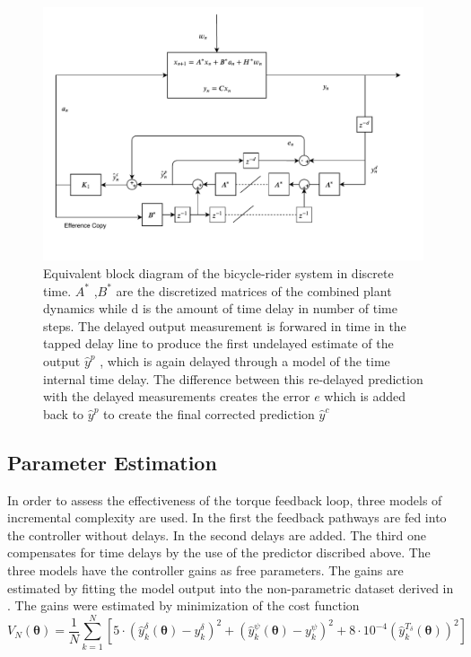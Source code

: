  \begin{figure}[ht]
    \centering
    \captionsetup{justification=centering,margin=2cm}

    \includegraphics[scale=0.6]{images/discrete_block.pdf}
    \caption{Equivalent block diagram of the bicycle-rider system in discrete time. \ensuremath{A^*} ,\ensuremath{B^*} are the discretized matrices of the combined plant dynamics while d is the amount of time delay in number of time steps. The delayed output measurement is forwared in time in the tapped delay line to produce the first undelayed estimate of the output \ensuremath{\hat{y}^p} , which is again delayed through a model of the time internal time delay. The difference between this re-delayed prediction with the delayed measurements creates the error \ensuremath{e} which is added back to  \ensuremath{\hat{y}^p}  to create the final corrected prediction \ensuremath{\hat{y}^c} }
    \label{fig:paper4}
\end{figure}

\subsection{Parameter Estimation }

In order to assess the effectiveness of the torque feedback loop, three models of incremental complexity are used. In the first the feedback pathways are fed into the controller without delays. In the second delays are added. The third one compensates for time delays by the use of the predictor discribed above. The three models have the  controller gains as free parameters. The gains are estimated by fitting the model output into the non-parametric dataset derived in \cite{dialynaseffect}.  The gains were estimated by minimization of the cost function 
\begin{equation}
    V_{N}(\boldsymbol{\theta})=\frac{1}{N} \sum_{k=1}^{N}\left[5\cdot\left(\hat{y}^{\delta}_k(\mathbf{\theta})-y^\delta_k\right)^{2}+\left(\hat{y}^{\psi}_k(\mathbf{\theta})-y^\psi_k\right)^{2}+8\cdot10^{-4}\left(\hat{y}^{T_\delta}_k(\mathbf{\theta})\right)^2\right]
    \label{eq:cost}
    \end{equation}

